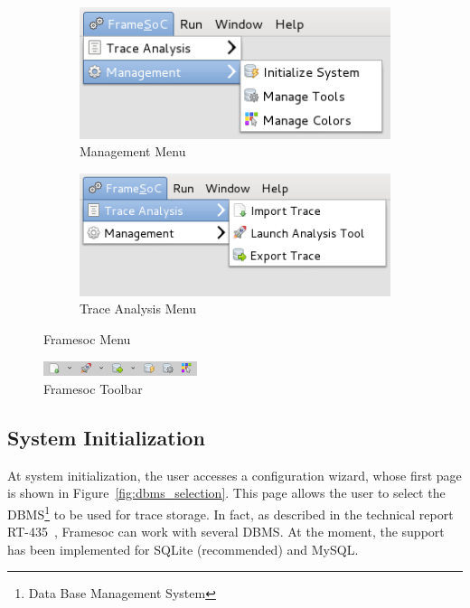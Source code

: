 \documentclass[twoside]{article}
\begin{document}
\begin{sloppypar}
\begin{figure}[h!]
  \centering
  \begin{subfigure}[c]{0.45\textwidth}
    \includegraphics[width=1.0\textwidth]{images/menu_management.png}
    \caption{Management Menu}
    \label{fig:menu_management}
  \end{subfigure}
  \hspace{30pt}
  \begin{subfigure}[c]{0.45\textwidth}
    \includegraphics[width=1.0\textwidth]{images/menu_trace_analysis.png}
    \caption{Trace Analysis Menu}
    \label{fig:menu_trace_analysis}
  \end{subfigure}
  \caption{Framesoc Menu}
  \label{fig:menu}
\end{figure}

\begin{figure}[h!]
  \centering
    \includegraphics[width=0.4\textwidth]{images/toolbar.png}
  \caption{Framesoc Toolbar}
  \label{fig:toolbar}
\end{figure}

\subsection{System Initialization}
\label{subsec:init}

At system initialization, the user accesses a configuration wizard, whose first page is shown in Figure~\ref{fig:dbms_selection}. 
This page allows the user to select the DBMS\footnote{Data Base Management System} to be used for trace storage.
In fact, as described in the technical report RT-435~\cite{pagano:hal-00830008}, Framesoc can work with several DBMS.
At the moment, the support has been implemented for SQLite (recommended) and MySQL.


\end{sloppypar}
\end{document}
